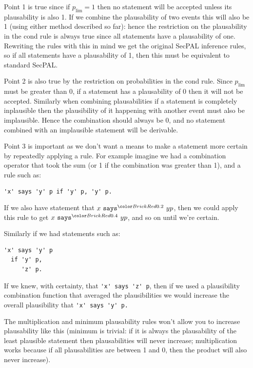 \documentclass[thesis.tex]{subfiles}
\begin{document}
Point 1 is true since if $p_{\text{lim}} = 1$ then no statement will
be accepted unless its plausability is also 1.  If we combine the
plausability of two events this will also be 1 (using either method
described so far): hence the restriction on the plausability in the
cond rule is always true since all statements have a plausability of
one.  Rewriting the rules with this in mind we get the original SecPAL
inference rules, so if all statements have a plausability of 1, then
this must be equivalent to standard SecPAL.

Point 2 is also true by the restriction on probabilities in the cond
rule.  Since $p_{\text{lim}}$ must be greater than 0, if a statement
has a plausability of 0 then it will not be accepted.  Similarly when
combining plausabilities if a statement is completely inplausible then
the plausibility of it happening with another event must also be
implausible.  Hence the combination should always be 0, and no
statement combined with an implausible statement will be derivable.

Point 3 is important as we don't want a means to make a statement more
certain by repeatedly applying a rule.  For example imagine we had a
combination operator that took the sum (or 1 if the combination was
greater than 1), and a rule such as:

\begin{lstlisting} 
'x' says 'y' p if 'y' p, 'y' p.
\end{lstlisting}

If we also have statement that $x \says{0.2} y p$,
then we could apply this rule to get $x \says{0.4} y p$, and so on
until we're certain.

Similarly if we had statements  such as:
\begin{lstlisting} 
'x' says 'y' p 
  if 'y' p,
     'z' p.
\end{lstlisting}

If we knew, with certainty, that \lstinline!'x' says 'z' p!, then if
we used a plausibility combination function that averaged the
plausibilities we would increase the overall plausibility that
\lstinline!'x' says 'y' p.!

The multiplication and minimum plausability rules won't allow you to
increase plausability like this (minimum is trivial: if it is always
the plausability of the least plausible statement then plausabilities
will never increase; multiplication works because if all
plausabilities are between 1 and 0, then the product will also never
increase).
\end{document}
